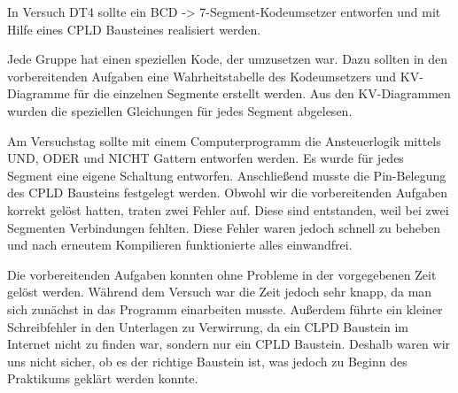 In Versuch DT4 sollte ein BCD -> 7-Segment-Kodeumsetzer entworfen und mit Hilfe eines CPLD Bausteines realisiert werden.\par 
Jede Gruppe hat einen speziellen Kode, der umzusetzen war. Dazu sollten in den vorbereitenden Aufgaben eine Wahrheitstabelle des Kodeumsetzers und KV-Diagramme für die einzelnen Segmente erstellt werden. Aus den KV-Diagrammen wurden die speziellen Gleichungen für jedes Segment abgelesen. \par
Am Versuchstag sollte mit einem Computerprogramm die Ansteuerlogik mittels UND, ODER und NICHT Gattern entworfen werden. Es wurde für jedes Segment eine eigene Schaltung entworfen. Anschließend musste die Pin-Belegung des CPLD Bausteins festgelegt werden. Obwohl wir die vorbereitenden Aufgaben korrekt gelöst hatten, traten zwei Fehler auf. Diese sind entstanden, weil bei zwei Segmenten Verbindungen fehlten. Diese Fehler waren jedoch schnell zu beheben und nach erneutem Kompilieren funktionierte alles einwandfrei. \par
Die vorbereitenden Aufgaben konnten ohne Probleme in der vorgegebenen Zeit gelöst werden. Während dem Versuch war die Zeit jedoch sehr knapp, da man sich zunächst in das Programm einarbeiten musste. Außerdem führte ein kleiner Schreibfehler in den Unterlagen zu Verwirrung, da ein CLPD Baustein im Internet nicht zu finden war, sondern nur ein CPLD Baustein. Deshalb waren wir uns nicht sicher, ob es der richtige Baustein ist, was jedoch zu Beginn des Praktikums geklärt werden konnte.
 